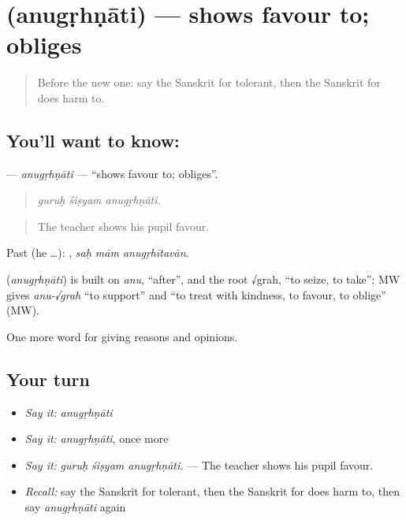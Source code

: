 \section[\texorpdfstring{\sk{अनुगृह्णाति} (anugṛhṇāti)}{अनुगृह्णाति (anugṛhṇāti)}]{ (anugṛhṇāti) — shows favour to; obliges}

\label{lesson:SA-C352-anugrhnati}



\begin{quote}
Before the new one: say the Sanskrit for tolerant, then the Sanskrit for does harm to.
\end{quote}

\subsection*{You'll want to know: }
\textbf{} — \emph{anugṛhṇāti} — \textquotedblleft{}shows favour to; obliges\textquotedblright{}.

\begin{quote}
  
\end{quote}

\begin{quote}
\emph{guruḥ śiṣyam anugṛhṇāti.}
\end{quote}

\begin{quote}
The teacher shows his pupil favour.
\end{quote}

Past (he …):   , \emph{saḥ mām anugṛhītavān}.

\begin{cousinweb}
\textbf{} (\emph{anugṛhṇāti}) is built on \emph{anu}, \textquotedblleft{}after\textquotedblright{}, and the root √grah, \textquotedblleft{}to seize, to take\textquotedblright{}; MW gives \emph{anu-√grah} \textquotedblleft{}to support\textquotedblright{} and \textquotedblleft{}to treat with kindness, to favour, to oblige\textquotedblright{} (MW).
\end{cousinweb}

\begin{grammarlens}[title={What you've built}]
One more word for giving reasons and opinions.
\end{grammarlens}

\subsection*{Your turn}
\begin{itemize}
\raggedright
  \item \emph{Say it:} \emph{anugṛhṇāti}
  \item \emph{Say it:} \emph{anugṛhṇāti}, once more
  \item \emph{Say it:} \emph{guruḥ śiṣyam anugṛhṇāti.} — The teacher shows his pupil favour.
  \item \emph{Recall:} say the Sanskrit for tolerant, then the Sanskrit for does harm to, then say \emph{anugṛhṇāti} again
\end{itemize}

